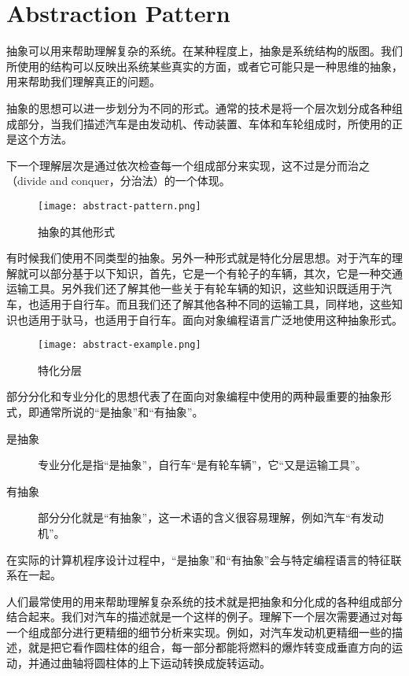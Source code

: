 \section{Abstraction Pattern}

抽象可以用来帮助理解复杂的系统。在某种程度上，抽象是系统结构的版图。我们所使用的结构可以反映出系统某些真实的方面，或者它可能只是一种思维的抽象，用来帮助我们理解真正的问题。

抽象的思想可以进一步划分为不同的形式。通常的技术是将一个层次划分成各种组成部分，当我们描述汽车是由发动机、传动装置、车体和车轮组成时，所使用的正是这个方法。

下一个理解层次是通过依次检查每一个组成部分来实现，这不过是分而治之（divide and conquer，分治法）的一个体现。

\begin{figure}[htbp]
\centering
\texttt{[image: abstract-pattern.png]}
\caption{抽象的其他形式}
\label{fig:abstract-pattern}
\end{figure}

有时候我们使用不同类型的抽象。另外一种形式就是特化分层思想。对于汽车的理解就可以部分基于以下知识，首先，它是一个有轮子的车辆，其次，它是一种交通运输工具。另外我们还了解其他一些关于有轮车辆的知识，这些知识既适用于汽车，也适用于自行车。而且我们还了解其他各种不同的运输工具，同样地，这些知识也适用于驮马，也适用于自行车。面向对象编程语言广泛地使用这种抽象形式。

\begin{figure}[htbp]
\centering
\texttt{[image: abstract-example.png]}
\caption{特化分层}
\label{fig:abstract-example}
\end{figure}

部分分化和专业分化的思想代表了在面向对象编程中使用的两种最重要的抽象形式，即通常所说的“是抽象”和“有抽象”。

\begin{description}
\item[是抽象]

专业分化是指“是抽象”，自行车“是有轮车辆”，它“又是运输工具”。

\item[有抽象]

部分分化就是“有抽象”，这一术语的含义很容易理解，例如汽车“有发动机”。
\end{description}

在实际的计算机程序设计过程中，“是抽象”和“有抽象”会与特定编程语言的特征联系在一起。

人们最常使用的用来帮助理解复杂系统的技术就是把抽象和分化成的各种组成部分结合起来。我们对汽车的描述就是一个这样的例子。理解下一个层次需要通过对每一个组成部分进行更精细的细节分析来实现。例如，对汽车发动机更精细一些的描述，就是把它看作圆柱体的组合，每一部分都能将燃料的爆炸转变成垂直方向的运动，并通过曲轴将圆柱体的上下运动转换成旋转运动。


